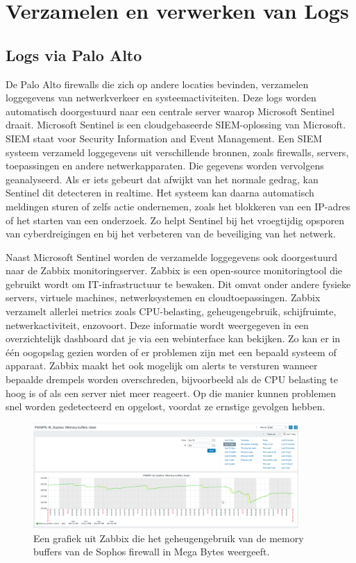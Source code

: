 \section{Verzamelen en verwerken van Logs}

\subsection{Logs via Palo Alto}
De Palo Alto firewalls die zich op andere locaties bevinden, verzamelen loggegevens van netwerkverkeer en systeemactiviteiten. Deze logs worden automatisch doorgestuurd naar een centrale server waarop Microsoft Sentinel draait. Microsoft Sentinel is een cloudgebaseerde SIEM-oplossing van Microsoft. SIEM staat voor Security Information and Event Management.
Een SIEM systeem verzameld loggegevens uit verschillende bronnen, zoals firewalls, servers, toepassingen en andere netwerkapparaten. Die gegevens worden vervolgens geanalyseerd. Als er iets gebeurt dat afwijkt van het normale gedrag, kan Sentinel dit detecteren in realtime. Het systeem kan daarna automatisch meldingen sturen of zelfs actie ondernemen, zoals het blokkeren van een IP-adres of het starten van een onderzoek. Zo helpt Sentinel bij het vroegtijdig opsporen van cyberdreigingen en bij het verbeteren van de beveiliging van het netwerk.


Naast Microsoft Sentinel worden de verzamelde loggegevens ook doorgestuurd naar de Zabbix monitoringserver. Zabbix is een open-source monitoringtool die gebruikt wordt om IT-infrastructuur te bewaken. Dit omvat onder andere fysieke servers, virtuele machines, netwerksystemen en cloudtoepassingen.
Zabbix verzamelt allerlei metrics zoals CPU-belasting, geheugengebruik, schijfruimte, netwerkactiviteit, enzovoort. Deze informatie wordt weergegeven in een overzichtelijk dashboard dat je via een webinterface kan bekijken. Zo kan er in één oogopslag gezien worden of er problemen zijn met een bepaald systeem of apparaat.
Zabbix maakt het ook mogelijk om alerts te versturen wanneer bepaalde drempels worden overschreden, bijvoorbeeld als de CPU belasting te hoog is of als een server niet meer reageert. Op die manier kunnen problemen snel worden gedetecteerd en opgelost, voordat ze ernstige gevolgen hebben.

\begin{figure}[H]
    \centering
    \includegraphics[width=0.9\textwidth]{fotos/SophosZabbix.png}
    \caption[Sophos Memory Buffer in Zabbix]{\label{fig:grail}Een grafiek uit Zabbix die het geheugengebruik van de memory buffers van de Sophos firewall in Mega Bytes weergeeft.}
\end{figure} 


